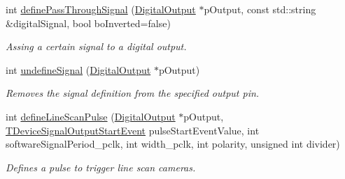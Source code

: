 \begin{DoxyCompactItemize}
int \hyperlink{classmv_i_m_p_a_c_t_1_1acquire_1_1_output_signal_generator_frame_grabber_abc196b3121a43ba476e2f8b2415c0c8a}{define\+Pass\+Through\+Signal} (\hyperlink{classmv_i_m_p_a_c_t_1_1acquire_1_1_digital_output}{Digital\+Output} $\ast$p\+Output, const std\+::string \&digital\+Signal, bool bo\+Inverted=false)
\begin{DoxyCompactList}\small\item\em Assing a certain signal to a digital output. \end{DoxyCompactList}\item 
int \hyperlink{classmv_i_m_p_a_c_t_1_1acquire_1_1_output_signal_generator_frame_grabber_a4311d27a250b52f733074778a31ac822}{undefine\+Signal} (\hyperlink{classmv_i_m_p_a_c_t_1_1acquire_1_1_digital_output}{Digital\+Output} $\ast$p\+Output)
\begin{DoxyCompactList}\small\item\em Removes the signal definition from the specified output pin. \end{DoxyCompactList}\item 
int \hyperlink{classmv_i_m_p_a_c_t_1_1acquire_1_1_output_signal_generator_frame_grabber_a1bb27162093ef2ed424036cb7a129da5}{define\+Line\+Scan\+Pulse} (\hyperlink{classmv_i_m_p_a_c_t_1_1acquire_1_1_digital_output}{Digital\+Output} $\ast$p\+Output, \hyperlink{group___device_specific_interface_ga83333b94d7a6a3f1ba96189b4e71fac0}{T\+Device\+Signal\+Output\+Start\+Event} pulse\+Start\+Event\+Value, int software\+Signal\+Period\+\_\+pclk, int width\+\_\+pclk, int polarity, unsigned int divider)
\begin{DoxyCompactList}\small\item\em Defines a pulse to trigger line scan cameras. \end{DoxyCompactList}\end{DoxyCompactItemize}
